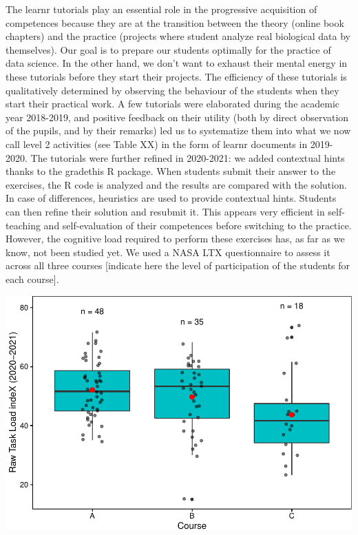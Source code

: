 \documentclass[
]{article}
\begin{document}
The learnr tutorials play an essential role in the progressive
acquisition of competences because they are at the transition between
the theory (online book chapters) and the practice (projects where
student analyze real biological data by themselves). Our goal is to
prepare our students optimally for the practice of data science. In the
other hand, we don't want to exhaust their mental energy in these
tutorials before they start their projects. The efficiency of these
tutorials is qualitatively determined by observing the behaviour of the
students when they start their practical work. A few tutorials were
elaborated during the academic year 2018-2019, and positive feedback on
their utility (both by direct observation of the pupils, and by their
remarks) led us to systematize them into what we now call level 2
activities (see Table XX) in the form of learnr documents in 2019-2020.
The tutorials were further refined in 2020-2021: we added contextual
hints thanks to the gradethis R package. When students submit their
answer to the exercises, the R code is analyzed and the results are
compared with the solution. In case of differences, heuristics are used
to provide contextual hints. Students can then refine their solution and
resubmit it. This appears very efficient in self-teaching and
self-evaluation of their competences before switching to the practice.
However, the cognitive load required to perform these exercises has, as
far as we know, not been studied yet. We used a NASA LTX questionnaire
to assess it across all three courses {[}indicate here the level of
participation of the students for each course{]}.

\includegraphics{teaching_data_science_files/figure-latex/unnamed-chunk-5-1.pdf}
\end{document}
